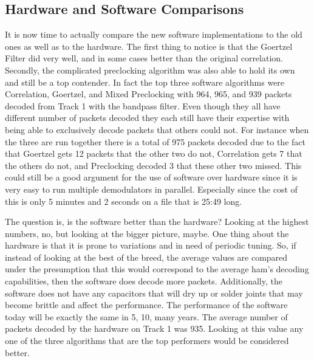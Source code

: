 \subsection{Hardware and Software Comparisons}
It is now time to actually compare the new software implementations to the old ones as well as to the hardware. The first thing to notice is that the Goertzel Filter did very well, and in some cases better than the original correlation. Secondly, the complicated preclocking algorithm was also able to hold its own and still be a top contender. In fact the top three software algorithms were Correlation, Goertzel, and Mixed Preclocking with 964, 965, and 939 packets decoded from Track 1 with the bandpass filter. Even though they all have different number of packets decoded they each still have their expertise with being able to exclusively decode packets that others could not. For instance when the three are run together there is a total of 975 packets decoded due to the fact that Goertzel gets 12 packets that the other two do not, Correlation gets 7 that the others do not, and Preclocking decoded 3 that these other two missed. This could still be a good argument for the use of software over hardware since it is very easy to run multiple demodulators in parallel. Especially since the cost of this is only 5 minutes and 2 seconds on a file that is 25:49 long.

The question is, is the software better than the hardware? Looking at the highest numbers, no, but looking at the bigger picture, maybe. One thing about the hardware is that it is prone to variations and in need of periodic tuning. So, if instead of looking at the best of the breed, the average values are compared under the presumption that this would correspond to the average ham's decoding capabilities, then the software does decode more packets. Additionally, the software does not have any capacitors that will dry up or solder joints that may become brittle and affect the performance. The performance of the software today will be exactly the same in 5, 10, many years. The average number of packets decoded by the hardware on Track 1 was 935. Looking at this value any one of the three algorithms that are the top performers would be considered better.
